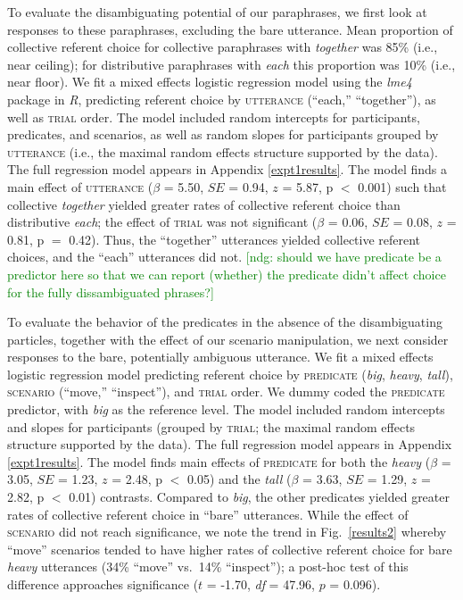 \documentclass[linguex]{sp}
\newcommand{\ndg}[1]{\textcolor{Green}{[ndg: #1]}}
\begin{document}
To evaluate the disambiguating potential of our paraphrases, we first look at responses to these paraphrases, excluding the bare utterance. Mean proportion of collective referent choice for collective paraphrases with \emph{together} was 85\% (i.e., near ceiling); for distributive paraphrases with \emph{each} this proportion was 10\% (i.e., near floor). We fit a mixed effects logistic regression model \citep{baayenetal2008} using the \emph{lme4} package \citep{batesetal2014} in \emph{R}, predicting referent choice by \textsc{utterance} (``each,'' ``together''), as well as \textsc{trial} order.  The model included random intercepts for participants, predicates, and scenarios, as well as random slopes for participants grouped by \textsc{utterance} (i.e., the maximal random effects structure supported by the data). The full regression model appears in Appendix \ref{expt1results}. The model finds a main effect of \textsc{utterance} ($\beta$ = 5.50, $SE$ = 0.94, $z$ = 5.87, p $<$ 0.001) such that collective \emph{together} yielded greater rates of collective referent choice than distributive \emph{each}; the effect of \textsc{trial} was not significant ($\beta$ = 0.06, $SE$ = 0.08, $z$ = 0.81, p $=$ 0.42). Thus, the ``together'' utterances yielded collective referent choices, and the ``each'' utterances did not.
\ndg{should we have predicate be a predictor here so that we can report (whether) the predicate didn't affect choice for the fully dissambiguated phrases?}

To evaluate the behavior of the predicates in the absence of the disambiguating particles, together with the effect of our scenario manipulation, we next consider responses to the bare, potentially ambiguous utterance. We fit a mixed effects logistic regression model predicting referent choice by \textsc{predicate} (\emph{big}, \emph{heavy}, \emph{tall}), \textsc{scenario} (``move,'' ``inspect''), and \textsc{trial} order. We dummy coded the \textsc{predicate} predictor, with \emph{big} as the reference level. The model included random intercepts and slopes for participants (grouped by \textsc{trial}; the maximal random effects structure supported by the data). The full regression model appears in Appendix \ref{expt1results}. The model finds main effects of \textsc{predicate} for both the \emph{heavy} ($\beta$ = 3.05, $SE$ = 1.23, $z$ = 2.48, p $<$ 0.05) and the \emph{tall} ($\beta$ = 3.63, $SE$ = 1.29, $z$ = 2.82, p $<$ 0.01) contrasts. Compared to \emph{big}, the other predicates yielded greater rates of collective referent choice in ``bare'' utterances. While the effect of \textsc{scenario} did not reach significance, we note the trend in Fig.~\ref{results2} whereby ``move'' scenarios tended to have higher rates of collective referent choice for bare \emph{heavy} utterances (34\% ``move'' vs.~14\% ``inspect''); a post-hoc test of this difference approaches significance ($t$ = -1.70, \emph{df} = 47.96, $p$ = 0.096).
\end{document}
